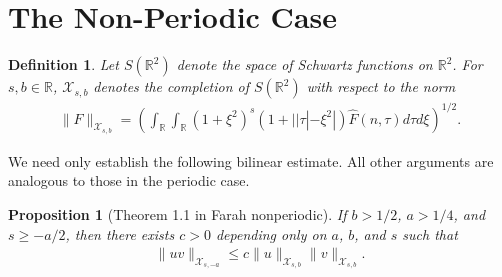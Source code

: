\documentclass[12pt,reqno]{amsart}
\numberwithin{equation}{section}  %
\newcommand{\rr}{\mathbb{R}}
\newcommand{\wh}{\widehat}
\newtheorem{proposition}[theorem]{Proposition}
\newtheorem{definition}[theorem]{Definition}
\begin{document}
\section{The Non-Periodic Case} 
\label{sec:non-periodic-case}
%
%
\begin{definition}
  Let $S(\rr^{2})$ denote the space of Schwartz functions on
  $\rr^{2}$.  For $s, b \in \rr$, $\mathcal{X}_{s,b}$
  denotes the completion of $S(\rr^{2})$ with
  respect to the norm
  \begin{equation}
  \begin{split}
    \|F\|_{\mathcal{X}_{s,b}} = \left( \int_{\rr} \int_{\rr} (1 + \xi^{2})^{s}
    (1 + | | \tau | - \xi^{2} |) \wh{F}(n, \tau) d \tau d \xi \right)^{1/2}.
  \end{split}
  \label{eqn:bous-norm-real}
  \end{equation}
\end{definition}
%
%
We need only establish the following bilinear estimate. All other arguments are
analogous to those in the periodic case. \qquad \qedsymbol
%
\begin{proposition}[Theorem 1.1 in Farah nonperiodic]
\label{prop:bilin-est-real}
If $b > 1/2$, $a > 1/4$, and $s \ge -a/2$, 
  then there exists $c > 0$ depending only on $a$, $b$, and $s$ such that
  \begin{equation*}
  \begin{split}
    \| uv \|_{\mathcal{X}_{s,-a}} \le c \| u \|_{\mathcal{X}_{s,b}} \| v \|_{\mathcal{X}_{s,b}}.
  \end{split}
  \end{equation*}
\end{proposition}
%
%
%
\end{document}
